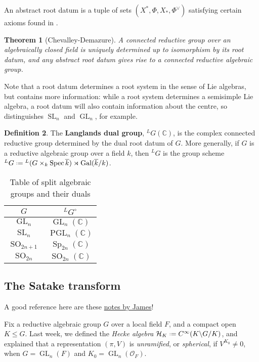 \documentclass[11pt]{report}
\let\mc\mathcal
\newcommand{\1}{\mathbbm 1}
\newcommand{\C}{\mathbb{C}}
\renewcommand{\O}{\mc O}
\newcommand*{\defeq}{\mathrel{\vcenter{\baselineskip0.5ex \lineskiplimit0pt
      \hbox{\scriptsize.}\hbox{\scriptsize.}}}%
  =}
\renewcommand{\bar}{\overline}
\DeclareMathOperator{\Spec}{Spec}
\DeclareMathOperator{\SO}{SO}
\DeclareMathOperator{\Sp}{Sp}
\DeclareMathOperator{\SL}{SL}
\DeclareMathOperator{\GL}{GL}
\DeclareMathOperator{\PGL}{PGL}
\DeclareMathOperator{\Gal}{Gal}
\theoremstyle{plain}
\newtheorem{thm}{Theorem}[section]
\newcounter{ex}
\theoremstyle{definition}
\newtheorem{mydef}[thm]{Definition}
\theoremstyle{remark}
\numberwithin{equation}{section}
\begin{document}
An abstract root datum is a tuple of sets $(X^{*},\Phi,X_{*},\Phi^{\vee})$ satisfying certain axioms found in \cite[Def.~2.41]{getz2010}.

\begin{thm}[Chevalley-Demazure]
  A connected reductive group over an algebraically closed field is
  uniquely determined up to isomorphism by its root datum, and any
  abstract root datum gives rise to a connected reductive algebraic group.
\end{thm}
Note that a root datum determines a root system in the sense of Lie algebras, but contains more information: while a root system determines a semisimple Lie algebra, a root datum will also contain information about the centre, so distinguishes $\SL_{n}$ and $\GL_{n}$, for example.

\begin{mydef}
  The \textbf{Langlands dual group}, ${}^{L}G(\C)$, is the complex
  connected reductive group determined by the dual root datum of
  $G$. More generally, if $G$ is a reductive algebraic group over a
  field $k$, then ${}^{L}G$ is the group scheme
  ${}^{L}G \defeq {}^{L}(G \times_{k} \Spec \bar k) \rtimes \Gal(\bar k/k)$.
\end{mydef}

\begin{table}[htbp]
  \centering
  \begin{tabular}{c|c}
    $G$ & ${}^{L}G^{\circ}$ \\ \hline
    $\GL_{n}$ & $\GL_{n}(\C)$ \\
    $\SL_{n}$ & $\PGL_{n}(\C)$ \\
    $\SO_{2n+1}$ & $\Sp_{2n}(\C)$ \\
    $\SO_{2n}$ & $\SO_{2n}(\C)$
  \end{tabular}
  \caption{Table of split algebraic groups and their duals}
  \label{table:dual-groups}
\end{table}

\subsection{The Satake transform}
\label{sec:satake-transform}

A good reference here are these \href{https://people.maths.ox.ac.uk/newton/week5.pdf}{notes by James}!

Fix a reductive algebraic group $G$ over a local field $F$, and a
compact open $K \le G$. Last week, we defined the \emph{Hecke algebra}
$\mc H_{K} \defeq C^{\infty}(K \backslash G / K)$, and explained that a representation $(\pi, V)$ is \emph{unramified}, or \emph{spherical}, if $V^{K_{0}} \ne 0$, when $G = \GL_{n}(F)$ and  $K_{0} = \GL_{n}(\O_{F})$.
\end{document}
